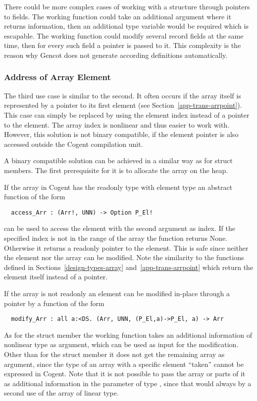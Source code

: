 There could be more complex cases of working with a structure through pointers to fields. The working function could
take an additional argument where it returns information, then an additional type variable  would be required
which is escapable. The working function could modify several record fields at the same time, then for every such field
a pointer is passed to it. This complexity is the reason why Gencot does not generate according definitions automatically.

\subsubsection{Address of Array Element}

The third use case is similar to the second. It often occurs if the array itself is represented by a pointer to its first
element (see Section~\ref{app-trans-arrpoint}). This case can simply be replaced by using the element index instead of a 
pointer to the element. The array index is nonlinear and thus easier to work with. However, this solution is not binary
compatible, if the element pointer is also accessed outside the Cogent compilation unit.

A binary compatible solution can be achieved in a similar way as for struct members. The first prerequisite for it is
to allocate the array on the heap.

If the array in Cogent has the readonly type  with element type  an abstract function of the form
\begin{verbatim}
  access_Arr : (Arr!, UNN) -> Option P_El!
\end{verbatim}
can be used to access the element with the second argument as index.  If the specified index is not in the range of the array the
function returns None. Otherwise it returns a readonly pointer to the element. This is safe 
since neither the element nor the array can be modified. Note the similarity to the  functions defined in
Sections~\ref{design-types-array} and~\ref{app-trans-arrpoint} which return the element itself instead of a pointer.

If the array is not readonly an element can be modified in-place through a pointer by a function of the form
\begin{verbatim}
  modify_Arr : all a:<DS. (Arr, UNN, (P_El,a)->P_El, a) -> Arr
\end{verbatim}
As for the struct member the working function takes an additional information of nonlinear type as argument, which can be
used as input for the modification. Other than for the struct member it does not get the remaining array as argument,
since the type of an array with a specific element ``taken'' cannot be expressed in Cogent. Note that it is not possible
to pass the array or parts of it as additional information in the parameter of type , since that would always by
a second use of the array of linear type.

